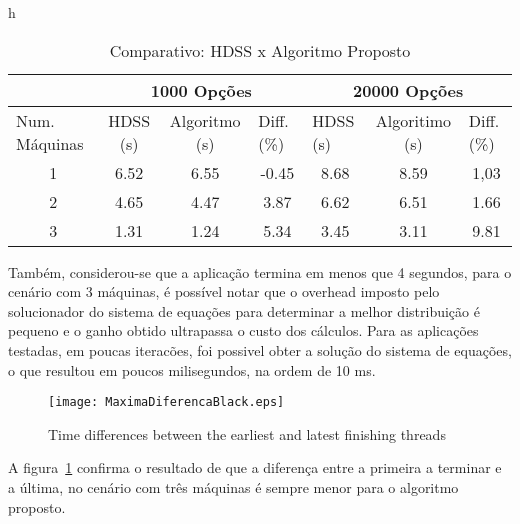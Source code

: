 \begin{table}{h}
\centering
\tiny
\caption{Comparativo: HDSS x Algoritmo Proposto}

\begin{tabular}{c|c|c|c|c|c|c|}
\cline{2-7}
\multicolumn{1}{l|}{}                 & \multicolumn{3}{c|}{1000 Opções}                              & \multicolumn{3}{c|}{20000 Opções}                                                  \\ \hline
\multicolumn{1}{|l|}{Num. Máquinas} & HDSS (s) & Algoritmo (s) & \multicolumn{1}{l|}{Diff. (\%)} & \multicolumn{1}{l|}{HDSS (s)} & Algoritimo (s) & \multicolumn{1}{l|}{Diff. (\%)} \\ \hline
\multicolumn{1}{|c|}{1 }       & 6.52     & 6.55              & -0.45                           & 8.68                          & 8.59              & 1,03                            \\ \hline
\multicolumn{1}{|c|}{2 }      & 4.65     & 4.47              & 3.87                            & 6.62                          & 6.51              & 1.66                            \\ \hline
\multicolumn{1}{|c|}{3 }      & 1.31     & 1.24              & 5.34                            & 3.45                          & 3.11              &               9.81                  \\ \hline
\end{tabular}
\label{table: black}
\end{table}

Também, considerou-se que a aplicação termina em menos que 4 segundos, para o cenário com 3 máquinas, é possível notar que o overhead imposto pelo solucionador do sistema de equações para determinar a melhor distribuição é pequeno e o ganho obtido ultrapassa o custo dos cálculos. Para as aplicações testadas, em poucas iteracões, foi possivel obter a solução do sistema de equações, o que resultou em poucos milisegundos, na ordem de 10 ms.

\begin{figure}[htb]
	\begin{center}
	\centering
			\texttt{[image: MaximaDiferencaBlack.eps]}
	\caption{Time differences between the earliest and latest finishing threads}
	\label{fig:diferencaThreadsBlack}
	\end{center}
\end{figure}

A figura~\ref{fig:diferencaThreadsBlack} confirma o resultado de que a diferença entre a primeira a terminar  e a última, no cenário com três máquinas é sempre menor para o algoritmo proposto.


